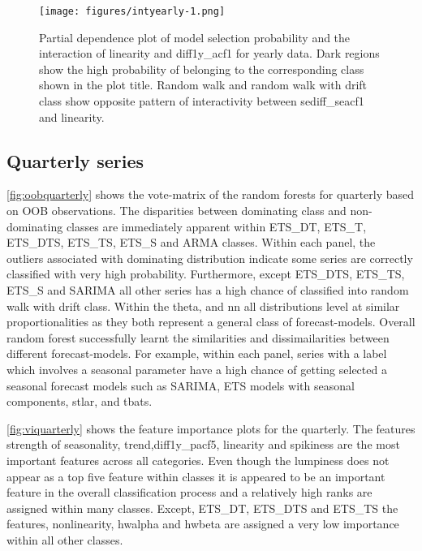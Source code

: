 \documentclass[11pt,a4paper,]{article}
\begin{document}
\begin{figure}
\centering
\texttt{[image: figures/intyearly-1.png]}
\caption{\label{fig:intyearly}Partial dependence plot of model selection probability and the interaction of linearity and diff1y\_acf1 for yearly data. Dark regions show the high probability of belonging to the corresponding class shown in the plot title. Random walk and random walk with drift class show opposite pattern of interactivity between sediff\_seacf1 and linearity.}
\end{figure}

\hypertarget{quarterly-series}{%
\subsection{Quarterly series}\label{quarterly-series}}

\autoref{fig:oobquarterly} shows the vote-matrix of the random forests for quarterly based on OOB observations. The disparities between dominating class and non-dominating classes are immediately apparent within ETS\_DT, ETS\_T, ETS\_DTS, ETS\_TS, ETS\_S and ARMA classes. Within each panel, the outliers associated with dominating distribution indicate some series are correctly classified with very high probability. Furthermore, except ETS\_DTS, ETS\_TS, ETS\_S and SARIMA all other series has a high chance of classified into random walk with drift class. Within the theta, and nn all distributions level at similar proportionalities as they both represent a general class of forecast-models. Overall random forest successfully learnt the similarities and dissimailarities between different forecast-models. For example, within each panel, series with a label which involves a seasonal parameter have a high chance of getting selected a seasonal forecast models such as SARIMA, ETS models with seasonal components, stlar, and tbats.

\autoref{fig:viquarterly} shows the feature importance plots for the quarterly. The features strength of seasonality, trend,diff1y\_pacf5, linearity and spikiness are the most important features across all categories. Even though the lumpiness does not appear as a top five feature within classes it is appeared to be an important feature in the overall classification process and a relatively high ranks are assigned within many classes. Except, ETS\_DT, ETS\_DTS and ETS\_TS the features, nonlinearity, hwalpha and hwbeta are assigned a very low importance within all other classes.
\end{document}
